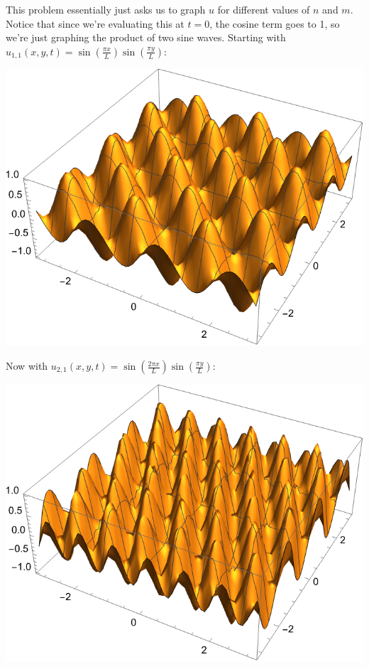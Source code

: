 \documentclass{article}
\begin{document}
\begin{solution}
	This problem essentially just asks us to graph $u$ for different values of $n$ and $m$. Notice that 
	since we're evaluating this at $t = 0$, the cosine term goes to 1, so we're just graphing
	the product of two sine waves. Starting with $u_{1, 1}(x, y, t) = 
	\sin(\frac{\pi x}{L}) \sin(\frac{\pi y}{L})$:
	\begin{center}
		\includegraphics[scale=0.7]{u11.png}
	\end{center}
	Now with $u_{2, 1}(x, y, t) = \sin(\frac{2 \pi x}{L}) \sin(\frac{\pi y}{L})$:
	\begin{center}
		\includegraphics[scale=0.7]{u21.png}

\end{center}
\end{solution}
\end{document}
